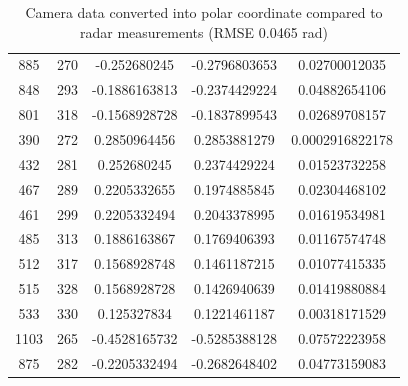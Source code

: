 \begin{table}[htbp]
\begin{tabular}{|c|c|c|c|c|}
        885 & 270 & -0.252680245 & -0.2796803653 & 0.02700012035 \\
        848 & 293 & -0.1886163813 & -0.2374429224 & 0.04882654106 \\
        801 & 318 & -0.1568928728 & -0.1837899543 & 0.02689708157 \\
        390 & 272 & 0.2850964456 & 0.2853881279 & 0.0002916822178 \\
        432 & 281 & 0.252680245 & 0.2374429224 & 0.01523732258 \\
        467 & 289 & 0.2205332655 & 0.1974885845 & 0.02304468102 \\
        461 & 299 & 0.2205332494 & 0.2043378995 & 0.01619534981 \\
        485 & 313 & 0.1886163867 & 0.1769406393 & 0.01167574748 \\
        512 & 317 & 0.1568928748 & 0.1461187215 & 0.01077415335 \\
        515 & 328 & 0.1568928728 & 0.1426940639 & 0.01419880884 \\
        533 & 330 & 0.125327834 & 0.1221461187 & 0.00318171529 \\
        1103 & 265 & -0.4528165732 & -0.5285388128 & 0.07572223958 \\
        875 & 282 & -0.2205332494 & -0.2682648402 & 0.04773159083 \\
    \hline
\end{tabular}
\caption{Camera data converted into polar coordinate compared to radar measurements (RMSE 0.0465 rad)}
\label{tab:cam_radar_data}
\end{table}

\newpage
